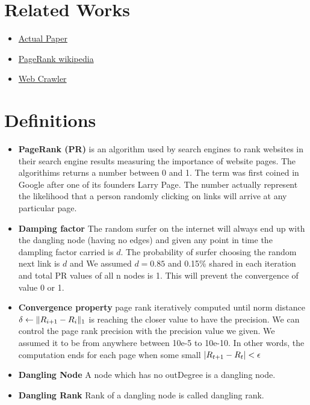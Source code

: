 \documentclass{article}
\DeclarePairedDelimiter{\norm}{\lVert}{\rVert}
\DeclarePairedDelimiter{\abs}{\lvert}{\rvert}
\begin{document}
\section{Related Works}
\label{sec:relWork}
\begin{itemize}
    \item \href{http://ilpubs.stanford.edu:8090/422/1/1999-66.pdf}{Actual Paper} 
    \item \href{https://en.wikipedia.org/wiki/PageRank}{PageRank wikipedia} 
    \item \href{https://www.webfx.com/blog/internet/what-is-a-web-crawler/#:~:text=For%20example%2C%20Google%20has%20its,DuckDuckBot%20for%20DuckDuckGo}{Web Crawler} 
\end{itemize}

\section{Definitions}
\label{sec:def}

\begin{itemize}
    \item \textbf{PageRank (PR)} is an algorithm used by search engines to rank websites in their search engine results measuring the importance of website pages. The algorithims returns a number between 0 and 1. The term was first coined in Google after one of its founders Larry Page. The number actually represent the likelihood that a person randomly clicking on links will arrive at any particular page.
    \item \textbf{Damping factor} The random surfer on the internet will always end up with the dangling node (having no edges) and given any point in time the dampling factor carried is $d$. The probability of surfer choosing the random next link is $d$ and We assumed $d=0.85$ and 0.15\% shared in each iteration and total PR values of all n nodes is 1. This will prevent the convergence of value 0 or 1.
    \item \textbf{Convergence property} page rank iteratively computed until norm distance $\delta \leftarrow \norm{R_{i+1} - R_i}_1$ is reaching the closer value to have the precision. We can control the page rank precision with the precision value we given. We assumed it to be from anywhere between 10e-5 to 10e-10. In other words, the computation ends for each page when some small $ \abs{R_{t+1} - R_t} < \epsilon$
    \item \textbf{Dangling Node} A node which has no outDegree is a dangling node.
    \item \textbf{Dangling Rank} Rank of a dangling node is called dangling rank.
\end{itemize}
\end{document}
